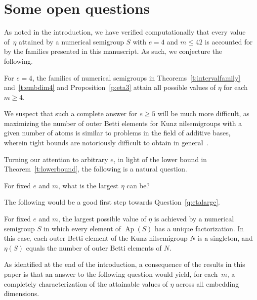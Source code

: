\documentclass[ALCO]{cedram}
\DeclareMathOperator\Ap{Ap}
\begin{document}
\section{Some open questions}\label{sec:openquestions}
\label{sec:extras}


As noted in the introduction, we have verified computationally that every value of~$\eta$ attained by a numerical semigroup $S$ with $e = 4$ and $m \le 42$ is accounted for by the families presented in this manuscript.  As such, we conjecture the following.  

\begin{conj}\label{conj:embdim4}
For $e = 4$, the families of numerical semigroups in Theorems~\ref{t:intervalfamily} and~\ref{t:embdim4} and Proposition~\ref{p:eta3} attain all possible values of $\eta$ for each $m \ge 4$.  
\end{conj}

We suspect that such a complete answer for $e \ge 5$ will be much more difficult, as maximizing the number of outer Betti elements for Kunz nilsemigroups with a given number of atoms is similar to problems in the field of additive bases, wherein tight bounds are notoriously difficult to obtain in general~\cite{newupperboundfiniteadditivebases,extremalbasesfinitecyclic,upperboundfiniteadditive2bases}.  

Turning our attention to arbitrary $e$, in light of the lower bound in Theorem~\ref{t:lowerbound}, the following is a natural question.  

\begin{question}\label{q:etalarge}
For fixed $e$ and $m$, what is the largest $\eta$ can be?  
\end{question}

The following would be a good first step towards Question~\ref{q:etalarge}.  

\begin{conj}\label{conj:uniqueaperyupperbound}
For fixed $e$ and $m$, the largest possible value of $\eta$ is achieved by a numerical semigroup $S$ in which every element of $\Ap(S)$ has a unique factorization.  In this case, each outer Betti element of the Kunz nilsemigroup $N$ is a singleton, and $\eta(S)$ equals the number of outer Betti elements of $N$.  
\end{conj}


As identified at the end of the introduction, a consequence of the results in this paper is that an answer to the following question would yield, for each~$m$, a completely characterization of the attainable values of $\eta$ across all embedding dimensions.  
\end{document}
